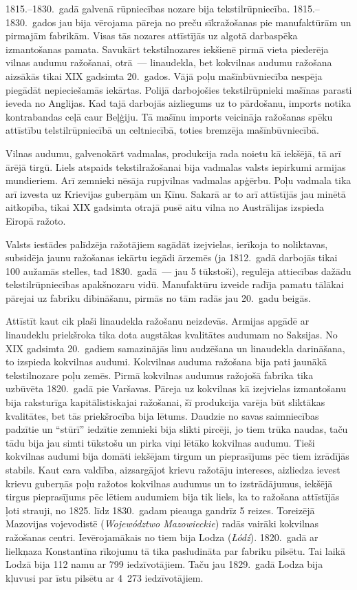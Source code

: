 \documentclass[twoside,a5paper,12pt,fleqn,openany]{extbook}
\newcommand{\pltxti}[1]{\textit{\textpolish{#1}}}
\begin{document}
1815.--1830.~gadā galvenā rūpniecības nozare bija tekstilrūpniecība. 1815.--1830.~gados jau bija vērojama pāreja no preču sīkražošanas pie manufaktūrām un pirmajām fabrikām. Visas tās nozares attīstījās uz algotā darbaspēka izmantošanas pamata. Savukārt tekstilnozares iekšienē pirmā vieta piederēja vilnas audumu ražošanai, otrā~--- linaudekla, bet kokvilnas audumu ražošana aizsākās tikai XIX gadsimta 20.~gados. Vājā poļu mašīnbūvniecība nespēja piegādāt nepieciešamās iekārtas. Polijā darbojošies tekstilrūpnieki mašīnas parasti ieveda no Anglijas. Kad tajā darbojās aizliegums uz to pārdošanu, imports notika kontrabandas ceļā caur Beļģiju. Tā mašīnu imports veicināja ražošanas spēku attīstību telstilrūpniecībā un celtniecībā, toties bremzēja mašīnbūvniecībā.

Vilnas audumu, galvenokārt vadmalas, produkcija rada noietu kā iekšējā, tā arī ārējā tirgū. Liels atspaids tekstilražošanai bija vadmalas valsts iepirkumi armijas mundieriem. Arī zemnieki nēsāja rupjvilnas vadmalas apģērbu. Poļu vadmala tika arī izvesta uz Krievijas guberņām un Ķīnu. Sakarā ar to arī attīstījās jau minētā aitkopība, tikai XIX gadsimta otrajā pusē aitu vilna no Austrālijas izspieda Eiropā ražoto.

Valsts iestādes palīdzēja ražotājiem sagādāt izejvielas, ierīkoja to noliktavas, subsidēja jaunu ražošanas iekārtu iegādi ārzemēs (ja 1812.~gadā darbojās tikai 100 aužamās stelles, tad 1830.~gadā~--- jau 5 tūkstoši), regulēja attiecības dažādu tekstilrūpniecības apakšnozaru vidū. Manufaktūru izveide radīja pamatu tālākai pārejai uz fabriku dibināšanu, pirmās no tām radās jau 20.~gadu beigās.

Attīstīt kaut cik plaši linaudekla ražošanu neizdevās. Armijas apgādē ar linaudeklu priekšroka tika dota augstākas kvalitātes audumam no Saksijas. No XIX gadsimta 20.~gadiem samazinājās linu audzēšana un linaudekla darināšana, to izspieda kokvilnas audumi. Kokvilnas auduma ražošana bija pati jaunākā tekstilnozare poļu zemēs. Pirmā kokvilnas audumus ražojošā fabrika tika uzbūvēta 1820.~gadā pie Varšavas. Pāreja uz kokvilnas kā izejvielas izmantošanu bija raksturīga kapitālistiskajai ražošanai, šī produkcija varēja būt sliktākas kvalitātes, bet tās priekšrocība bija lētums. Daudzie no savas saimniecības padzītie un ``stūrī'' iedzītie zemnieki bija slikti pircēji, jo tiem trūka naudas, taču tādu bija jau simti tūkstošu un pirka viņi lētāko kokvilnas audumu. Tieši kokvilnas audumi bija domāti iekšējam tirgum un pieprasījums pēc tiem izrādījās stabils. Kaut cara valdība, aizsargājot krievu ražotāju intereses, aizliedza ievest krievu guberņās poļu ražotos kokvilnas audumus un to izstrādājumus, iekšējā tirgus pieprasījums pēc lētiem audumiem bija tik liels, ka to ražošana attīstījās ļoti strauji, no 1825. līdz 1830.~gadam pieauga gandrīz 5 reizes. Toreizējā Mazovijas vojevodistē (\pltxti{Województwo Mazowieckie}) radās vairāki kokvilnas ražošanas centri. Ievērojamākais no tiem bija Lodza (\pltxti{Łódź}). 1820.~gadā ar lielkņaza Konstantīna rīkojumu tā tika pasludināta par fabriku pilsētu. Tai laikā Lodzā bija 112 namu ar 799 iedzīvotājiem. Taču jau 1829.~gadā Lodza bija kļuvusi par īstu pilsētu ar 4~273 iedzīvotājiem.
\end{document}

